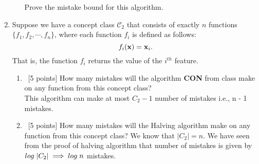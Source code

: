 \begin{enumerate}
\begin{enumerate}
    Prove the mistake bound for this algorithm.

  \end{enumerate}

\item Suppose we have a concept class $\mathcal{C}_2$ that consists
  of exactly $n$ functions $\{f_1, f_2, \cdots, f_n\}$, where each
  function $f_i$ is defined as follows:
  \begin{equation*}
    f_i({\bf x}) = {\bf x}_i.
  \end{equation*}
  That is, the function $f_i$ returns the value of the $i^{th}$
  feature.
  
  \begin{enumerate}
  \item~[5 points] How many mistakes will the algorithm
    \textbf{CON} from class make on any function from this concept
    class?\\
  This algorithm can make at most $C_2 - 1$ number of mistakes i.e., n - 1 mistakes.
    
  \item~[5 points] How many mistakes will the Halving algorithm make
    on any function from this concept class?
    We know that $|C_2| = n$. We have seen from the proof of halving algorithm that number of mistakes is given by $log\hspace{1mm}|C_2| \implies log\hspace{1mm}n$ mistakes.
  \end{enumerate}
  
\end{enumerate}



